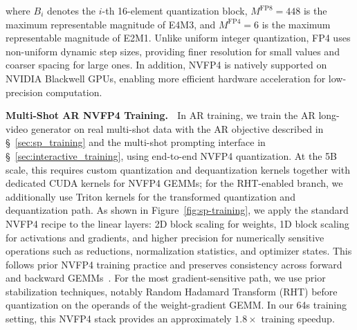 \documentclass{llmxive}
\begin{document}
where $B_i$ denotes the $i$-th 16-element quantization block, $M^{\text{FP8}} = 448$ is the maximum representable magnitude of E4M3, and $M^{\text{FP4}} = 6$ is the maximum representable magnitude of E2M1. Unlike uniform integer quantization, FP4 uses non-uniform dynamic step sizes, providing finer resolution for small values and coarser spacing for large ones. In addition, NVFP4 is natively supported on NVIDIA Blackwell GPUs, enabling more efficient hardware acceleration for low-precision computation.

\textbf{Multi-Shot AR NVFP4 Training.} $\;$
In AR training, we train the AR long-video generator on real multi-shot data with the AR objective described in \S~\ref{sec:sp_training} and the multi-shot prompting interface in \S~\ref{sec:interactive_training}, using end-to-end NVFP4 quantization. At the 5B scale, this requires custom quantization and dequantization kernels together with dedicated CUDA kernels for NVFP4 GEMMs; for the RHT-enabled branch, we additionally use Triton kernels for the transformed quantization and dequantization path. As shown in Figure~\ref{fig:sp-training}, we apply the standard NVFP4 recipe to the linear layers: 2D block scaling for weights, 1D block scaling for activations and gradients, and higher precision for numerically sensitive operations such as reductions, normalization statistics, and optimizer states. This follows prior NVFP4 training practice and preserves consistency across forward and backward GEMMs~\cite{abecassis2025pretraining,castro2025quartet}. For the most gradient-sensitive path, we use prior stabilization techniques, notably Random Hadamard Transform (RHT) before quantization on the operands of the weight-gradient GEMM. In our 64s training setting, this NVFP4 stack provides an approximately $1.8\times$ training speedup.
\end{document}
